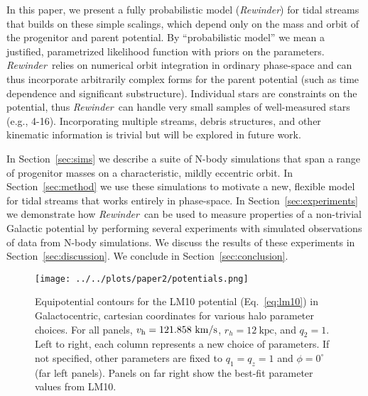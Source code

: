 \documentclass[letterpaper,12pt,preprint]{aastex}
\newcommand{\vhalo}{v_{\rm h}}
\newcommand{\rewinder}{\emph{Rewinder}}
\begin{document}
In this paper, we present a fully probabilistic model (\rewinder) for tidal streams that builds on these simple scalings, which depend only on the mass and orbit of the progenitor and parent potential. By ``probabilistic model'' we mean a justified, parametrized likelihood function with priors on the parameters. \rewinder\ relies on numerical orbit integration in ordinary phase-space and can thus incorporate arbitrarily complex forms for the parent potential (such as time dependence and significant substructure). Individual stars are constraints on the potential, thus \rewinder\ can handle very small samples of well-measured stars (e.g., 4-16). Incorporating multiple streams, debris structures, and other kinematic information is trivial but will be explored in future work.

In Section~\ref{sec:sims} we describe a suite of N-body simulations that span a range of progenitor masses on a characteristic, mildly eccentric orbit. In Section~\ref{sec:method} we use these simulations to motivate a new, flexible model for tidal streams that works entirely in phase-space. In Section~\ref{sec:experiments} we demonstrate how \rewinder\ can be used to measure properties of a non-trivial Galactic potential by performing several experiments with simulated observations of data from N-body simulations. We discuss the results of these experiments in Section~\ref{sec:discussion}. We conclude in Section~\ref{sec:conclusion}.

\begin{figure*}[!ht]
\begin{center}
\texttt{[image: ../../plots/paper2/potentials.png]}
\caption{ Equipotential contours for the LM10 potential (Eq.~\ref{eq:lm10}) in Galactocentric, cartesian coordinates for various halo parameter choices. For all panels, $\vhalo=121.858~\mathrm{km}/\mathrm{s}$, $r_h=12~\mathrm{kpc}$, and $q_2=1$. Left to right, each column represents a new choice of parameters. If not specified, other parameters are fixed to $q_1=q_z=1$ and $\phi=0^\circ$ (far left panels). Panels on far right show the best-fit parameter values from LM10. }\label{fig:potential}
\end{center}
\end{figure*}
\end{document}
